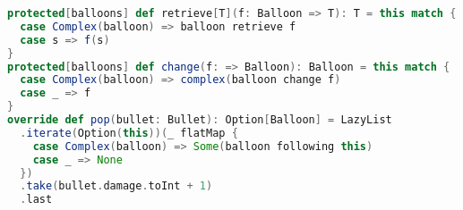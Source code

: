 \begin{lstlisting}[label=code:pop, language=Scala, caption=Implementazinoe dei palloncini]
protected[balloons] def retrieve[T](f: Balloon => T): T = this match {
  case Complex(balloon) => balloon retrieve f
  case s => f(s)
}
protected[balloons] def change(f: => Balloon): Balloon = this match {
  case Complex(balloon) => complex(balloon change f)
  case _ => f
}
override def pop(bullet: Bullet): Option[Balloon] = LazyList
  .iterate(Option(this))(_ flatMap {
    case Complex(balloon) => Some(balloon following this)
    case _ => None
  })
  .take(bullet.damage.toInt + 1)
  .last
\end{lstlisting}